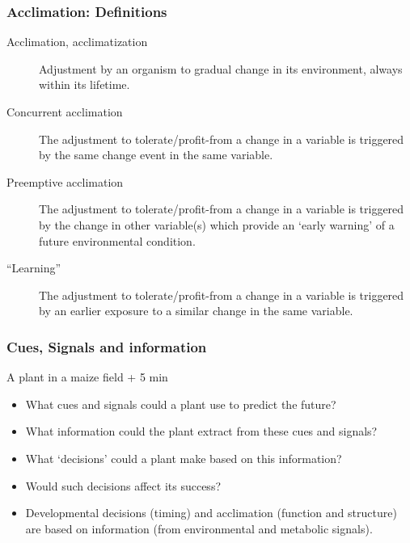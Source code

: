 \documentclass[10pt]{beamer}
\begin{document}
\begin{frame}
  \frametitle{Acclimation: Definitions}
  \begin{description}
    \item[Acclimation, acclimatization] Adjustment by an organism to gradual change in its environment, always within its lifetime.
    \item[Concurrent acclimation] The adjustment to tolerate/profit-from a change in a variable is triggered by the same change event in the same variable.
    \item[Preemptive acclimation] The adjustment to tolerate/profit-from a change in a variable is triggered by the change in other variable(s) which provide an `early warning' of a future environmental condition.
    \item[``Learning''] The adjustment to tolerate/profit-from a change in a variable is triggered by an earlier exposure to a similar change in the same variable.
  \end{description}
\end{frame}

\begin{frame}
\frametitle{Cues, Signals and information \Discussion}
\begin{block}{A plant in a maize field  + 5 min}
  \begin{itemize}
    \item What cues and signals could a plant use to predict the future?
    \item What information could the plant extract from these cues and signals?
    \item What `decisions' could a plant make based on this information?
    \item Would such decisions affect its success?
    \item Developmental decisions (timing) and acclimation (function and structure) are based on information (from environmental and metabolic signals).
   \end{itemize}
  \end{block}
\end{frame}
\end{document}
